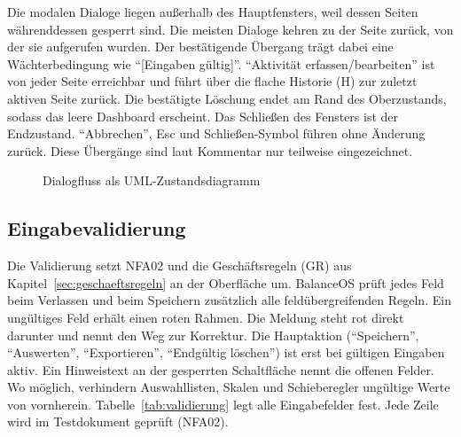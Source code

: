Die modalen Dialoge liegen außerhalb des Hauptfensters, weil dessen Seiten währenddessen gesperrt sind. Die meisten Dialoge kehren zu der Seite zurück, von der sie aufgerufen wurden. Der bestätigende Übergang trägt dabei eine Wächterbedingung wie \enquote{[Eingaben gültig]}. \enquote{Aktivität erfassen/bearbeiten} ist von jeder Seite erreichbar und führt über die flache Historie (H) zur zuletzt aktiven Seite zurück. Die bestätigte Löschung endet am Rand des Oberzustands, sodass das leere Dashboard erscheint. Das Schließen des Fensters ist der Endzustand. \enquote{Abbrechen}, Esc und Schließen-Symbol führen ohne Änderung zurück. Diese Übergänge sind laut Kommentar nur teilweise eingezeichnet.

\begin{figure}[H]
  \caption{Dialogfluss als UML-Zustandsdiagramm}\label{abb:dialogfluss}
  \centering
\end{figure}

\subsection{Eingabevalidierung}\label{sec:validierung}
Die Validierung setzt NFA02 und die Geschäftsregeln (GR) aus Kapitel~\ref{sec:geschaeftsregeln} an der Oberfläche um. BalanceOS prüft jedes Feld beim Verlassen und beim Speichern zusätzlich alle feldübergreifenden Regeln. Ein ungültiges Feld erhält einen roten Rahmen. Die Meldung steht rot direkt darunter und nennt den Weg zur Korrektur. Die Hauptaktion (\enquote{Speichern}, \enquote{Auswerten}, \enquote{Exportieren}, \enquote{Endgültig löschen}) ist erst bei gültigen Eingaben aktiv. Ein Hinweistext an der gesperrten Schaltfläche nennt die offenen Felder. Wo möglich, verhindern Auswahllisten, Skalen und Schieberegler ungültige Werte von vornherein. Tabelle~\ref{tab:validierung} legt alle Eingabefelder fest. Jede Zeile wird im Testdokument geprüft (NFA02).

